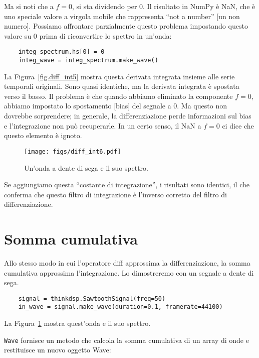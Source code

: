 \documentclass[12pt]{book} \usepackage[width=5.5in,height=8.5in, hmarginratio=3:2,vmarginratio=1:1]{geometry}
\begin{document}
Ma si noti che a $f=0$, si sta dividendo per 0. Il risultato in NumPy è NaN, che è uno speciale valore a virgola mobile che rappresenta ``not a number'' [un non numero]. Possiamo affrontare parzialmente questo problema impostando questo valore su 0 prima di riconvertire lo spettro in un'onda:

\begin{verbatim} 
    integ_spectrum.hs[0] = 0
    integ_wave = integ_spectrum.make_wave()
 \end{verbatim} 

La Figura~\ref{fig.diff_int5} mostra questa derivata integrata insieme alle serie temporali originali. Sono quasi identiche, ma la derivata integrata è spostata verso il basso. Il problema è che quando abbiamo eliminato la componente $f=0$, abbiamo impostato lo spostamento [bias] del segnale a 0. Ma questo non dovrebbe sorprendere; in generale, la differenziazione perde informazioni sul bias e l'integrazione non può recuperarle. In un certo senso, il NaN a $f=0$ ci dice che questo elemento è ignoto.

\begin{figure} 

\centerline{\texttt{[image: figs/diff\_int6.pdf]}} \caption{Un'onda a dente di sega e il suo spettro.} \label{fig.diff_int6} \end{figure} 

Se aggiungiamo questa ``costante di integrazione'', i risultati sono identici, il che conferma che questo filtro di integrazione è l'inverso corretto del filtro di differenziazione.

\section{Somma cumulativa} \label{cumsum} 

Allo stesso modo in cui l'operatore diff approssima la differenziazione, la somma cumulativa approssima l'integrazione. Lo dimostreremo con un segnale a dente di sega.

\begin{verbatim} 
    signal = thinkdsp.SawtoothSignal(freq=50)
    in_wave = signal.make_wave(duration=0.1, framerate=44100)
 \end{verbatim} 

La Figura~\ref{fig.diff_int6} mostra quest'onda e il suo spettro.

{\tt Wave} fornisce un metodo che calcola la somma cumulativa di un array di onde e restituisce un nuovo oggetto Wave:
\end{document}
